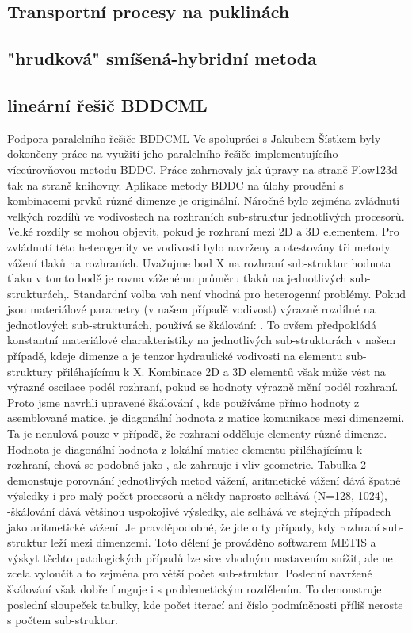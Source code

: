\documentclass[11pt]{report}
\begin{document}
\subsection{Transportní procesy na puklinách}
\subsection{"hrudková" smíšená-hybridní metoda}
\subsection{lineární řešič BDDCML}
Podpora paralelního řešiče BDDCML
Ve spolupráci s Jakubem Šístkem byly dokončeny práce na využití jeho paralelního 
řešiče implementujícího víceúrovňovou metodu BDDC. Práce zahrnovaly jak úpravy 
na straně Flow123d tak na straně knihovny. Aplikace metody BDDC na úlohy 
proudění s kombinacemi prvků různé dimenze je originální. Náročné bylo zejména 
zvládnutí velkých rozdílů ve vodivostech na rozhraních sub-struktur jednotlivých 
procesorů. Velké rozdíly se mohou objevit, pokud je rozhraní mezi 2D a 3D 
elementem. Pro zvládnutí této heterogenity ve vodivosti bylo navrženy a 
otestovány tři metody vážení tlaků na rozhraních. Uvažujme bod X na rozhraní 
sub-struktur hodnota tlaku v tomto bodě je rovna váženému průměru tlaků na 
jednotlivých sub-strukturách,. Standardní volba vah není vhodná pro heterogenní 
problémy. Pokud jsou materiálové parametry (v našem případě vodivost) výrazně 
rozdílné na jednotlových sub-strukturách, používá se škálování: . To ovšem 
předpokládá konstantní materiálové charakteristiky na jednotlivých 
sub-strukturách v našem případě, kdeje dimenze a je tenzor hydraulické vodivosti 
na elementu sub-struktury přiléhajícímu k X. Kombinace 2D a 3D elementů však 
může vést na výrazné oscilace podél rozhraní, pokud se hodnoty výrazně mění 
podél rozhraní. Proto jsme navrhli upravené škálování , kde používáme přímo 
hodnoty z asemblované matice, je diagonální hodnota z matice komunikace mezi 
dimenzemi. Ta je nenulová pouze v případě, že rozhraní odděluje elementy různé 
dimenze. Hodnota je diagonální hodnota z lokální matice elementu přiléhajícímu k 
rozhraní, chová se podobně jako , ale zahrnuje i vliv geometrie. Tabulka 2 
demonstuje porovnání jednotlivých metod vážení, aritmetické vážení dává špatné 
výsledky i pro malý počet procesorů a někdy naprosto selhává (N=128, 1024), 
-škálování dává většinou uspokojivé výsledky, ale selhává ve stejných případech 
jako aritmetické vážení. Je pravděpodobné, že jde o ty případy, kdy rozhraní 
sub-struktur leží mezi dimenzemi. Toto dělení je prováděno softwarem METIS a 
výskyt těchto patologických případů lze sice vhodným nastavením snížit, ale ne 
zcela vyloučit a to zejména pro větší počet sub-struktur. Poslední navržené 
škálování  však dobře funguje i s problemetickým rozdělením. To demonstruje 
poslední sloupeček tabulky, kde
počet iterací ani číslo podmíněnosti příliš neroste s počtem sub-struktur.
\end{document}

